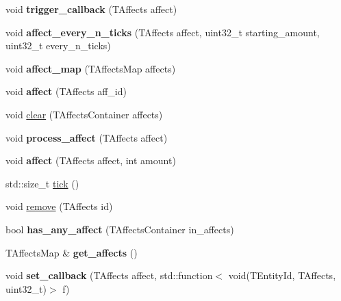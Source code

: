 \begin{DoxyCompactItemize}
\item 
\mbox{\label{structmods_1_1affects_1_1dissolver_a58e3fcea6f452e247f76840a5e16a0d9}} 
void {\bfseries trigger\+\_\+callback} (T\+Affects affect)
\item 
\mbox{\label{structmods_1_1affects_1_1dissolver_a91175b4f73883f8034d84380cce73794}} 
void {\bfseries affect\+\_\+every\+\_\+n\+\_\+ticks} (T\+Affects affect, uint32\+\_\+t starting\+\_\+amount, uint32\+\_\+t every\+\_\+n\+\_\+ticks)
\item 
\mbox{\label{structmods_1_1affects_1_1dissolver_a63eef9526551ba54ac683b849c737ae9}} 
void {\bfseries affect\+\_\+map} (T\+Affects\+Map affects)
\item 
\mbox{\label{structmods_1_1affects_1_1dissolver_aefe486fceee597c5c032832ddb25c1f4}} 
void {\bfseries affect} (T\+Affects aff\+\_\+id)
\item 
void \hyperlink{structmods_1_1affects_1_1dissolver_adda06b1b31ee9e7a55ac55132321f811}{clear} (T\+Affects\+Container affects)
\item 
\mbox{\label{structmods_1_1affects_1_1dissolver_a1f220e9e0e15da60d22065a42d709a91}} 
void {\bfseries process\+\_\+affect} (T\+Affects affect)
\item 
\mbox{\label{structmods_1_1affects_1_1dissolver_afa1664b53140ef4ddf136e2ee1b12c3b}} 
void {\bfseries affect} (T\+Affects affect, int amount)
\item 
std\+::size\+\_\+t \hyperlink{structmods_1_1affects_1_1dissolver_a26d75b016d86619cb74f80418f98bc10}{tick} ()
\item 
void \hyperlink{structmods_1_1affects_1_1dissolver_ad8059ffe681c083c83ec0fa82ef82a9b}{remove} (T\+Affects id)
\item 
\mbox{\label{structmods_1_1affects_1_1dissolver_a0114d6742feb5f288775024bf7ce35a3}} 
bool {\bfseries has\+\_\+any\+\_\+affect} (T\+Affects\+Container in\+\_\+affects)
\item 
\mbox{\label{structmods_1_1affects_1_1dissolver_a40c6cc4d89660af3813a24b596653b1e}} 
T\+Affects\+Map \& {\bfseries get\+\_\+affects} ()
\item 
\mbox{\label{structmods_1_1affects_1_1dissolver_a07299dbab300ae29d216e6bdf913574a}} 
void {\bfseries set\+\_\+callback} (T\+Affects affect, std\+::function$<$ void(T\+Entity\+Id, T\+Affects, uint32\+\_\+t)$>$ f)
\end{DoxyCompactItemize}
